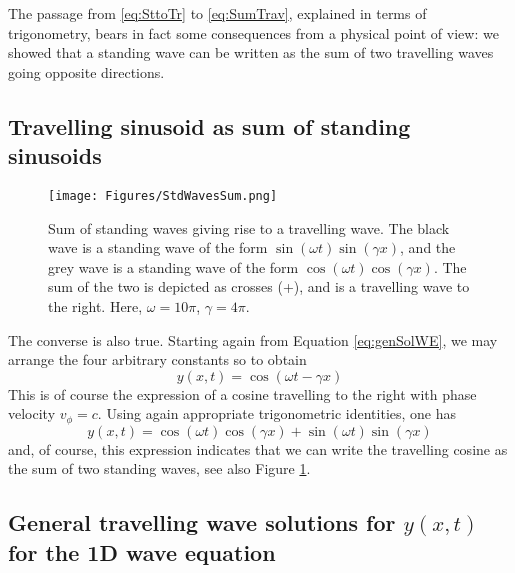 \documentclass[11pt,twoside,a4paper,english]{book}
\begin{document}
The passage from \eqref{eq:SttoTr} to \eqref{eq:SumTrav}, explained in terms of trigonometry, bears in fact some consequences from a physical point of view: we showed that a standing wave can be written as the sum of two travelling waves going opposite directions. 

\subsection{Travelling sinusoid as sum of standing sinusoids}
\begin{figure}[hbt]
\texttt{[image: Figures/StdWavesSum.png]}
\caption{Sum of standing waves giving rise to a travelling wave. The black wave is a standing wave of the form $\sin(\omega t)\sin(\gamma x)$, and the grey wave is a standing wave of the form $\cos(\omega t)\cos(\gamma x)$. The sum of the two is depicted as crosses (+), and is a travelling wave to the right. Here, $\omega = 10\pi$, $\gamma = 4\pi$.}\label{fig:stdTrav}
\end{figure}
The converse is also true. Starting again from Equation \eqref{eq:genSolWE}, we may arrange the four arbitrary constants so to obtain
\begin{equation}
y(x,t) = \cos(\omega t - \gamma x)
\end{equation}
This is of course the expression of a cosine travelling to the right with phase velocity $v_\phi = c$. Using again appropriate trigonometric identities, one has
\begin{equation}
y(x,t) = \cos(\omega t)\cos(\gamma x) + \sin(\omega t)\sin(\gamma x)
\end{equation}
and, of course, this expression indicates that we can write the travelling cosine as the sum of two standing waves, see also Figure \ref{fig:stdTrav}. 





\subsection{General travelling wave solutions for $y(x,t)$ for the 1D wave equation}
\end{document}
